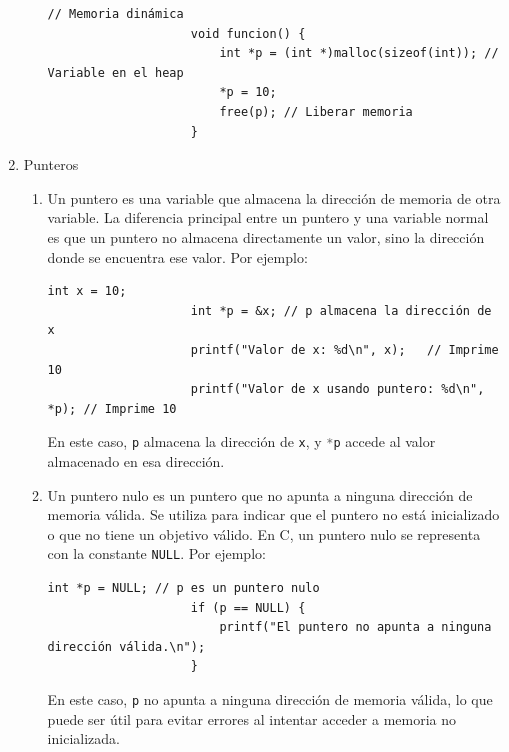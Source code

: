 \documentclass[12pt]{article}
\begin{document}
\begin{enumerate}
\begin{enumerate}[label*=\arabic*.]
\begin{lstlisting}[xleftmargin=-12.1em, inputencoding=utf8]
                    // Memoria dinámica
                    void funcion() {
                        int *p = (int *)malloc(sizeof(int)); // Variable en el heap
                        *p = 10;
                        free(p); // Liberar memoria
                    }
                \end{lstlisting}
            \end{enumerate}

            \item Punteros
            \begin{enumerate}[label*=\arabic*.]
                \item Un puntero es una variable que almacena la dirección de memoria de otra variable. La diferencia principal entre un puntero y una variable normal es que un puntero no almacena directamente un valor, sino la dirección donde se encuentra ese valor. Por ejemplo:
                \begin{lstlisting}[xleftmargin=-12.1em, inputencoding=utf8]
                    int x = 10;
                    int *p = &x; // p almacena la dirección de x
                    printf("Valor de x: %d\n", x);   // Imprime 10
                    printf("Valor de x usando puntero: %d\n", *p); // Imprime 10
                \end{lstlisting}
                En este caso, \lstinline[language=C]|p| almacena la dirección de \lstinline[language=C]|x|, y \lstinline[language=C]|*p| accede al valor almacenado en esa dirección.

                \item Un puntero nulo es un puntero que no apunta a ninguna dirección de memoria válida. Se utiliza para indicar que el puntero no está inicializado o que no tiene un objetivo válido. En C, un puntero nulo se representa con la constante \lstinline[language=C]|NULL|. Por ejemplo:
                \begin{lstlisting}[xleftmargin=-12.1em, inputencoding=utf8]
                    int *p = NULL; // p es un puntero nulo
                    if (p == NULL) {
                        printf("El puntero no apunta a ninguna dirección válida.\n");
                    }
                \end{lstlisting}
                En este caso, \lstinline[language=C]|p| no apunta a ninguna dirección de memoria válida, lo que puede ser útil para evitar errores al intentar acceder a memoria no inicializada.


\end{enumerate}
\end{enumerate}
\end{document}
